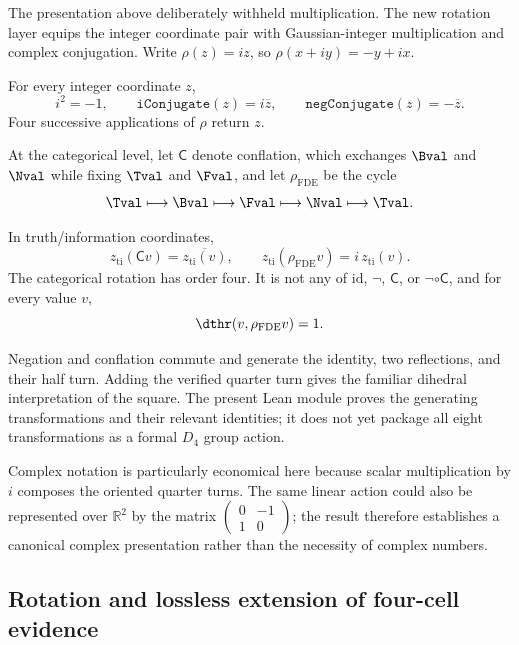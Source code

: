 The presentation above deliberately withheld multiplication. The new rotation
layer equips the integer coordinate pair with Gaussian-integer multiplication
and complex conjugation. Write \(\rho(z)=iz\), so
\(\rho(x+iy)=-y+ix\).

\begin{theorem}
For every integer coordinate \(z\),
\[
  i^2=-1,\qquad
  \mathtt{iConjugate}(z)=i\overline z,
  \qquad
  \mathtt{negConjugate}(z)=-\overline z.
\]
Four successive applications of \(\rho\) return \(z\).
\statusverified
\end{theorem}

At the categorical level, let \(\mathsf C\) denote conflation, which exchanges
\(\Bval\) and \(\Nval\) while fixing \(\Tval\) and \(\Fval\), and let
\(\rho_{\mathrm{FDE}}\) be the cycle
\[
  \Tval\longmapsto\Bval\longmapsto\Fval
  \longmapsto\Nval\longmapsto\Tval.
\]

\begin{theorem}
In truth/information coordinates,
\[
  z_{\mathrm{ti}}(\mathsf C v)=\overline{z_{\mathrm{ti}}(v)},
  \qquad
  z_{\mathrm{ti}}(\rho_{\mathrm{FDE}}v)
    =i\,z_{\mathrm{ti}}(v).
\]
The categorical rotation has order four. It is not any of
\(\mathrm{id}\), \(\neg\), \(\mathsf C\), or \(\neg\circ\mathsf C\),
and for every value \(v\),
\[
  \dthr(v,\rho_{\mathrm{FDE}}v)=1.
\]
\statusverified
\end{theorem}

Negation and conflation commute and generate the identity, two reflections,
and their half turn. Adding the verified quarter turn gives the familiar
dihedral interpretation of the square. The present Lean module proves the
generating transformations and their relevant identities; it does not yet
package all eight transformations as a formal \(D_4\) group action.
\statusinterpretive

Complex notation is particularly economical here because scalar multiplication
by \(i\) composes the oriented quarter turns. The same linear action could also
be represented over \(\mathbb R^2\) by the matrix
\(\left(\begin{smallmatrix}0&-1\\1&0\end{smallmatrix}\right)\); the result
therefore establishes a canonical complex presentation rather than the
necessity of complex numbers.

\subsection{Rotation and lossless extension of four-cell evidence}

